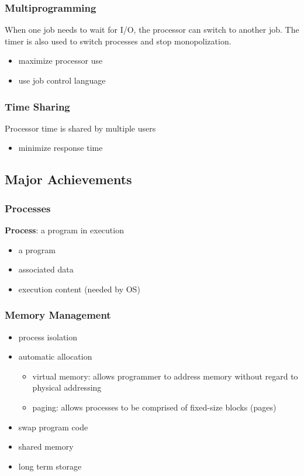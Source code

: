 \documentclass[]{article}
\theoremstyle{definition}
\begin{document}
			\subsubsection{Multiprogramming}
				When one job needs to wait for I/O, the processor can switch to another job. The timer is also used to switch processes and stop monopolization.
				\begin{itemize}
					\item maximize processor use
					\item use job control language 
				\end{itemize}
			\subsubsection{Time Sharing}
				Processor time is shared by multiple users
				\begin{itemize}
					\item minimize response time
				\end{itemize}
		\subsection{Major Achievements}
			\subsubsection{Processes}
				\textbf{Process}: a program in execution
				\begin{itemize}
					\item a program
					\item associated data
					\item execution content (needed by OS)
				\end{itemize}
			\subsubsection{Memory Management}
				\begin{itemize}
					\item process isolation
					\item automatic allocation
						\begin{itemize}
							\item virtual memory: allows programmer to address memory without regard to physical addressing
							\item paging: allows processes to be comprised of fixed-size blocks (pages)
						\end{itemize}
					\item swap program code
					\item shared memory
					\item long term storage
				\end{itemize}
\end{document}
